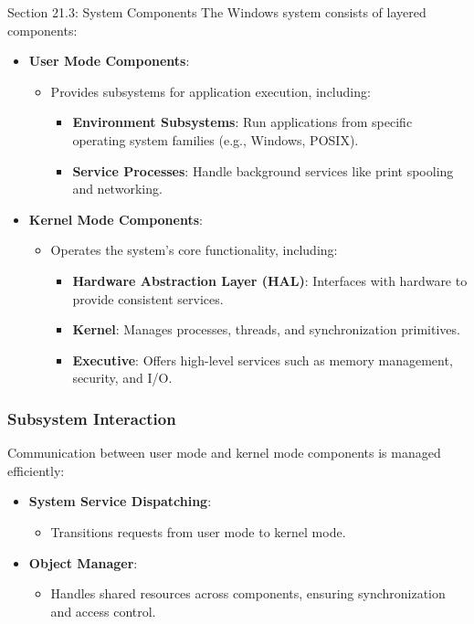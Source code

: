 \begin{notes}{Section 21.3: System Components}
    The Windows system consists of layered components:
    \begin{itemize}
        \item \textbf{User Mode Components}:
        \begin{itemize}
            \item Provides subsystems for application execution, including:
            \begin{itemize}
                \item \textbf{Environment Subsystems}: Run applications from specific operating system families (e.g., Windows, POSIX).
                \item \textbf{Service Processes}: Handle background services like print spooling and networking.
            \end{itemize}
        \end{itemize}
        \item \textbf{Kernel Mode Components}:
        \begin{itemize}
            \item Operates the system's core functionality, including:
            \begin{itemize}
                \item \textbf{Hardware Abstraction Layer (HAL)}: Interfaces with hardware to provide consistent services.
                \item \textbf{Kernel}: Manages processes, threads, and synchronization primitives.
                \item \textbf{Executive}: Offers high-level services such as memory management, security, and I/O.
            \end{itemize}
        \end{itemize}
    \end{itemize}
    
    \subsubsection*{Subsystem Interaction}
    
    Communication between user mode and kernel mode components is managed efficiently:
    \begin{itemize}
        \item \textbf{System Service Dispatching}:
        \begin{itemize}
            \item Transitions requests from user mode to kernel mode.
        \end{itemize}
        \item \textbf{Object Manager}:
        \begin{itemize}
            \item Handles shared resources across components, ensuring synchronization and access control.
        \end{itemize}
    \end{itemize}
    

\end{notes}

